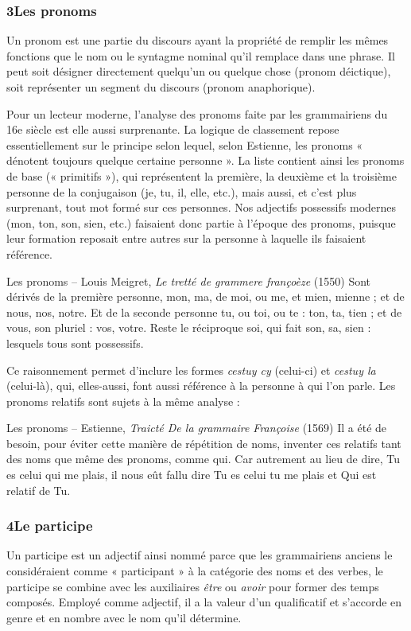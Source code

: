 \subsubsection*{3\quad Les pronoms}
Un pronom est une partie du discours ayant la propriété de remplir les mêmes fonctions que le nom ou le syntagme nominal qu’il remplace dans une phrase. Il peut soit désigner directement quelqu’un ou quelque chose (pronom déictique), soit représenter un segment du discours (pronom anaphorique).

Pour un lecteur moderne, l’analyse des pronoms faite par les grammairiens du 16e siècle est elle aussi surprenante. La logique de classement repose essentiellement sur le principe selon lequel, selon Estienne, les pronoms « dénotent toujours quelque certaine personne ». La liste contient ainsi les pronoms de base (« primitifs »), qui représentent la première, la deuxième et la troisième personne de la conjugaison (je, tu, il, elle, etc.), mais aussi, et c’est plus surprenant, tout mot formé sur ces personnes. Nos adjectifs possessifs modernes (mon, ton, son, sien, etc.) faisaient donc partie à l’époque des pronoms, puisque leur formation reposait entre autres sur la personne à laquelle ils faisaient référence.
\begin{lecture}{Les pronoms – Louis Meigret, \textit{Le tretté de grammere françoèze} (1550)}
Sont dérivés de la première personne, mon, ma, de moi, ou me, et mien, mienne ; et de nous, nos, notre. Et de la seconde personne tu, ou toi, ou te : ton, ta, tien ; et de vous, son pluriel : vos, votre. Reste le réciproque soi, qui fait son, sa, sien : lesquels tous sont possessifs.
\end{lecture}
Ce raisonnement permet d’inclure les formes \textit{cestuy cy} (celui-ci) et \textit{cestuy la} (celui-là), qui, elles-aussi, font aussi référence à la personne à qui l’on parle. Les pronoms relatifs sont sujets à la même analyse :
\begin{lecture}{Les pronoms – Estienne, \textit{Traicté De la grammaire Françoise} (1569)}
Il a été de besoin, pour éviter cette manière de répétition de noms, inventer ces relatifs tant des noms que même des pronoms, comme qui. Car autrement au lieu de dire, Tu es celui qui me plais, il nous eût fallu dire Tu es celui tu me plais et Qui est relatif de Tu.
\end{lecture}
\subsubsection*{4\quad Le participe}
Un participe est un adjectif ainsi nommé parce que les grammairiens anciens le considéraient comme « participant » à la catégorie des noms et des verbes, le participe se combine avec les auxiliaires \textit{être} ou \textit{avoir} pour former des temps composés. Employé comme adjectif, il a la valeur d’un qualificatif et s’accorde en genre et en nombre avec le nom qu’il détermine.

